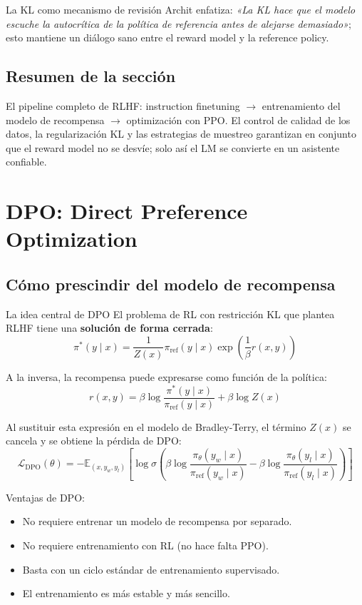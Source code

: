 \documentclass[a4paper]{article}
\begin{document}
\begin{importantbox}{La KL como mecanismo de revisión}
Archit enfatiza: \textit{«La KL hace que el modelo escuche la autocrítica de la política de referencia antes de alejarse demasiado»}; esto mantiene un diálogo sano entre el reward model y la reference policy.
\end{importantbox}

\subsection{Resumen de la sección}

El pipeline completo de RLHF: instruction finetuning $\to$ entrenamiento del modelo de recompensa $\to$ optimización con PPO. El control de calidad de los datos, la regularización KL y las estrategias de muestreo garantizan en conjunto que el reward model no se desvíe; solo así el LM se convierte en un asistente confiable.
\section{DPO: Direct Preference Optimization}

\subsection{Cómo prescindir del modelo de recompensa}

\begin{importantbox}{La idea central de DPO}
El problema de RL con restricción KL que plantea RLHF tiene una \textbf{solución de forma cerrada}:
$$\pi^*(y \mid x) = \frac{1}{Z(x)} \pi_{\mathrm{ref}}(y \mid x) \exp\left(\frac{1}{\beta} r(x, y)\right)$$

A la inversa, la recompensa puede expresarse como función de la política:
$$r(x, y) = \beta \log \frac{\pi^*(y \mid x)}{\pi_{\mathrm{ref}}(y \mid x)} + \beta \log Z(x)$$

Al sustituir esta expresión en el modelo de Bradley-Terry, el término $Z(x)$ se cancela y se obtiene la pérdida de DPO:
$$\mathcal{L}_{\mathrm{DPO}}(\theta) = -\mathbb{E}_{(x, y_w, y_l)}\left[\log \sigma\left(\beta \log \frac{\pi_\theta(y_w \mid x)}{\pi_{\mathrm{ref}}(y_w \mid x)} - \beta \log \frac{\pi_\theta(y_l \mid x)}{\pi_{\mathrm{ref}}(y_l \mid x)}\right)\right]$$
\end{importantbox}

Ventajas de DPO:
\begin{itemize}
    \item No requiere entrenar un modelo de recompensa por separado.
    \item No requiere entrenamiento con RL (no hace falta PPO).
    \item Basta con un ciclo estándar de entrenamiento supervisado.
    \item El entrenamiento es más estable y más sencillo.
\end{itemize}
\end{document}
